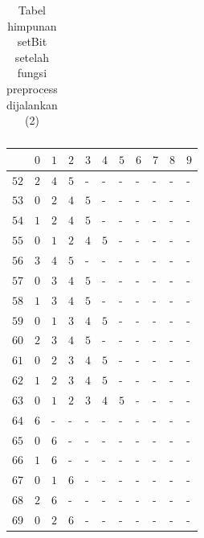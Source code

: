 \begin{appendices}
\begin{table}[H]
\begin{tabular} {|l|l|l|l|l|l|l|l|l|l|l|}
  	\end{tabular}\caption{Tabel himpunan setBit setelah fungsi preprocess dijalankan (2)}
  	\label{tab:setbit_2}
  \end{table}
  \begin{table}[H]
  	\centering
  	\begin{tabular} {|l|l|l|l|l|l|l|l|l|l|l|} \hline
  		\backslashbox{$Num$}{$index$} & $ 0 $ & $ 1 $ & $ 2 $ & $ 3 $ & $ 4 $ & $ 5 $ & $ 6 $ & $ 7 $ & $ 8 $ & $ 9 $ \\ \hline
  		$ 52 $ & $ 2 $ &$ 4 $ &$ 5 $ & - &  - &  - &  - &  - &  - &  -   \\ \hline
  		$ 53 $ & $ 0 $ &$ 2 $ &$ 4 $ &$ 5 $ & - &  - &  - &  - &  - &  -   \\ \hline
  		$ 54 $ & $ 1 $ &$ 2 $ &$ 4 $ &$ 5 $ & - &  - &  - &  - &  - &  -   \\ \hline
  		$ 55 $ & $ 0 $ &$ 1 $ &$ 2 $ &$ 4 $ &$ 5 $ & - &  - &  - &  - &  -   \\ \hline
  		$ 56 $ & $ 3 $ &$ 4 $ &$ 5 $ & - &  - &  - &  - &  - &  - &  -   \\ \hline
  		$ 57 $ & $ 0 $ &$ 3 $ &$ 4 $ &$ 5 $ & - &  - &  - &  - &  - &  -   \\ \hline
  		$ 58 $ & $ 1 $ &$ 3 $ &$ 4 $ &$ 5 $ & - &  - &  - &  - &  - &  -   \\ \hline
  		$ 59 $ & $ 0 $ &$ 1 $ &$ 3 $ &$ 4 $ &$ 5 $ & - &  - &  - &  - &  -   \\ \hline
  		$ 60 $ & $ 2 $ &$ 3 $ &$ 4 $ &$ 5 $ & - &  - &  - &  - &  - &  -   \\ \hline
  		$ 61 $ & $ 0 $ &$ 2 $ &$ 3 $ &$ 4 $ &$ 5 $ & - &  - &  - &  - &  -   \\ \hline
  		$ 62 $ & $ 1 $ &$ 2 $ &$ 3 $ &$ 4 $ &$ 5 $ & - &  - &  - &  - &  -   \\ \hline
  		$ 63 $ & $ 0 $ &$ 1 $ &$ 2 $ &$ 3 $ &$ 4 $ &$ 5 $ & - &  - &  - &  -   \\ \hline
  		$ 64 $ & $ 6 $ & - &  - &  - &  - &  - &  - &  - &  - &  -   \\ \hline
  		$ 65 $ & $ 0 $ &$ 6 $ & - &  - &  - &  - &  - &  - &  - &  -   \\ \hline
  		$ 66 $ & $ 1 $ &$ 6 $ & - &  - &  - &  - &  - &  - &  - &  -   \\ \hline
  		$ 67 $ & $ 0 $ &$ 1 $ &$ 6 $ & - &  - &  - &  - &  - &  - &  -   \\ \hline
  		$ 68 $ & $ 2 $ &$ 6 $ & - &  - &  - &  - &  - &  - &  - &  -   \\ \hline
  		$ 69 $ & $ 0 $ &$ 2 $ &$ 6 $ & - &  - &  - &  - &  - &  - &  -   \\ \hline

\end{tabular}
\end{table}
\end{appendices}
